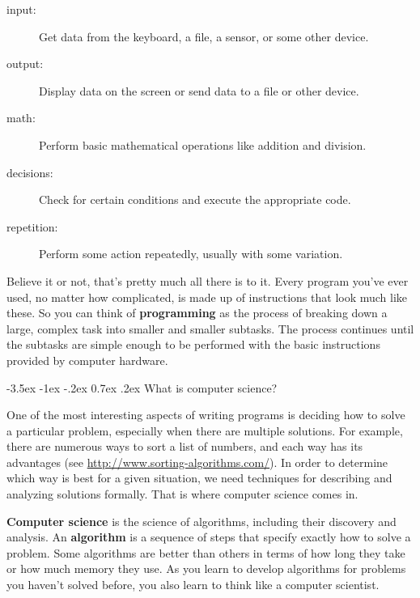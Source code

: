 \documentclass[12pt]{book}
\makeatletter
\theoremstyle{exercise}
\renewcommand{\section}{\@startsection{section}{1}{\z@}%
    {-3.5ex \@plus -1ex \@minus -.2ex}%
    {0.7ex \@plus.2ex}%
    {\normalfont\Large\bfseries}}
\makeatother
\begin{document}
\begin{description}
\item[input:] Get data from the keyboard, a file, a sensor, or some other device.
\item[output:] Display data on the screen or send data to a file or other device.
\item[math:] Perform basic mathematical operations like addition and division.
\item[decisions:] Check for certain conditions and execute the appropriate code.
\item[repetition:] Perform some action repeatedly, usually with some variation.
\end{description}


Believe it or not, that's pretty much all there is to it.
Every program you've ever used, no matter how complicated, is made up of instructions that look much like these.
So you can think of {\bf programming} as the process of breaking down a large, complex task into smaller and smaller subtasks.
The process continues until the subtasks are simple enough to be performed with the basic instructions provided by computer hardware.


\section{What is computer science?}

One of the most interesting aspects of writing programs is deciding how to solve a particular problem, especially when there are multiple solutions.
For example, there are numerous ways to sort a list of numbers, and each way has its advantages (see \url{http://www.sorting-algorithms.com/}).
In order to determine which way is best for a given situation, we need techniques for describing and analyzing solutions formally.
That is where computer science comes in.


{\bf Computer science} is the science of algorithms, including their discovery and analysis.
An {\bf algorithm} is a sequence of steps that specify exactly how to solve a problem.
Some algorithms are better than others in terms of how long they take or how much memory they use.
As you learn to develop algorithms for problems you haven't solved before, you also learn to think like a computer scientist.
\end{document}
